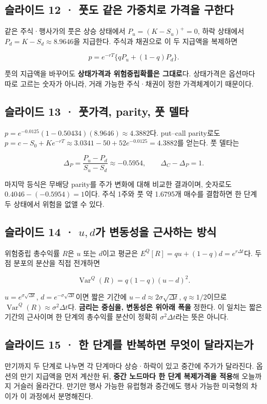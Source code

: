 \documentclass[11pt,a4paper]{article}
\begin{document}
\subsection{슬라이드 12 · 풋도 같은 가중치로 가격을 구한다}
같은 주식·행사가의 풋은 상승 상태에서 $P_u=(K-S_u)^+=0$, 하락 상태에서 $P_d=K-S_d\approx8.9646$을 지급한다. 주식과 채권으로 이 두 지급액을 복제하면\par

\[
p=e^{-rT}\{qP_u+(1-q)P_d\}.
\]

풋의 지급액을 바꾸어도 \textbf{상태가격과 위험중립확률은 그대로}다. 상태가격은 옵션마다 따로 고르는 숫자가 아니라, 거래 가능한 주식·채권이 정한 가격체계이기 때문이다.\par

\subsection{슬라이드 13 · 풋가격, parity, 풋 델타}
$p=e^{-0.0125}(1-0.50434)(8.9646)\approx4.3882$다. put–call parity로도 $p=c-S_0+Ke^{-rT}\approx3.0341-50+52e^{-0.0125}=4.3882$를 얻는다. 풋 델타는\par

\[
\Delta_P=\frac{P_u-P_d}{S_u-S_d}\approx-0.5954,\qquad
\Delta_C-\Delta_P=1.
\]

마지막 등식은 무배당 parity를 주가 변화에 대해 비교한 결과이며, 숫자로도 $0.4046-(-0.5954)=1$이다. 주식 1주와 풋 약 1.6795개 매수를 결합하면 한 단계 두 상태에서 위험을 없앨 수 있다.\par

\subsection{슬라이드 14 · $u,d$가 변동성을 근사하는 방식}
위험중립 총수익률 $R$은 $u$ 또는 $d$이고 평균은 $E^Q[R]=qu+(1-q)d=e^{r\Delta t}$다. 두 점 분포의 분산을 직접 전개하면\par

\[
\operatorname{Var}^Q(R)
=q(1-q)(u-d)^2.
\]

$u=e^{\sigma\sqrt{\Delta t}}$, $d=e^{-\sigma\sqrt{\Delta t}}$이면 짧은 기간에 $u-d\approx2\sigma\sqrt{\Delta t}$, $q\approx1/2$이므로 $\operatorname{Var}^Q(R)\approx\sigma^2\Delta t$다. \textbf{금리는 중심을, 변동성은 위아래 폭을} 정한다. 이 일치는 짧은 기간의 근사이며 한 단계의 총수익률 분산이 정확히 $\sigma^2\Delta t$라는 뜻은 아니다.\par

\subsection{슬라이드 15 · 한 단계를 반복하면 무엇이 달라지는가}
만기까지 두 단계로 나누면 각 단계마다 상승·하락이 있고 중간에 주가가 달라진다. 옵션의 만기 지급액을 먼저 계산한 뒤, \textbf{중간 노드마다 한 단계 복제가격을 적용}해 오늘까지 거슬러 올라간다. 만기만 행사 가능한 유럽형과 중간에도 행사 가능한 미국형의 차이가 이 과정에서 분명해진다.\par
\end{document}
